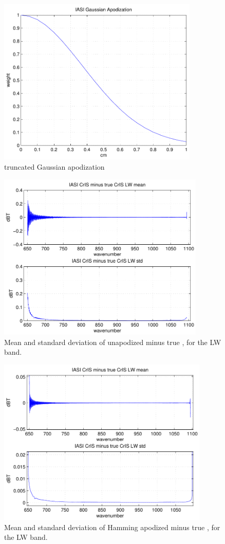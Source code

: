 \documentclass[12pt]{article}
\begin{document}

\begin{figure}
  \centering
  \includegraphics[height=8cm]{figures/iasi_gauss_app.pdf}
  \caption{{\iasi} truncated Gaussian apodization}
  \label{igauss}
\end{figure}

\begin{figure}
  \centering
  \includegraphics[height=8cm]{figures/iasi_cris_lw_1.pdf}
  \caption{Mean and standard deviation of unapodized {\iasi} {\cris}
    minus true {\cris}, for the {\cris} LW band.}
  \label{iclw1}
\end{figure}

\begin{figure}
  \centering
  \includegraphics[height=8cm]{figures/iasi_cris_lw_2.pdf}
  \caption{Mean and standard deviation of Hamming apodized {\iasi}
    {\cris} minus true {\cris}, for the {\cris} LW band.}
  \label{iclw2}
\end{figure}
\end{document}

